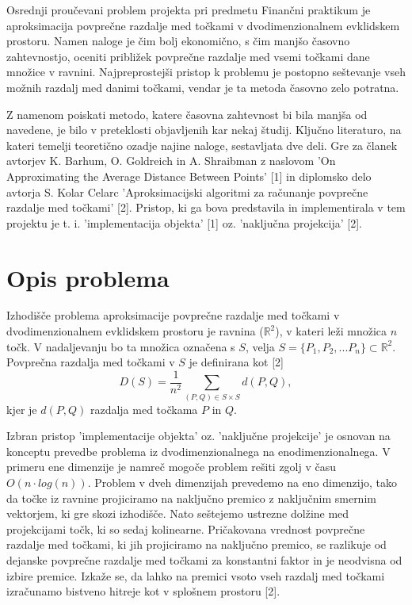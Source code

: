 \documentclass[12pt,a4paper]{amsart}
\theoremstyle{definition} %
\theoremstyle{plain} %
\newcommand{\R}{\mathbb R}
\begin{document}
Osrednji proučevani problem projekta pri predmetu Finančni praktikum je aproksimacija povprečne razdalje med točkami v dvodimenzionalnem evklidskem prostoru. Namen naloge je čim bolj ekonomično, s čim manjšo časovno zahtevnostjo, oceniti približek povprečne razdalje med vsemi točkami dane množice v ravnini. Najpreprostejši pristop k problemu je postopno seštevanje vseh možnih razdalj med danimi točkami, vendar je ta metoda časovno zelo potratna. 

Z namenom poiskati metodo, katere časovna zahtevnost bi bila manjša od navedene, je bilo v preteklosti objavljenih kar nekaj študij. Ključno literaturo, na kateri temelji teoretično ozadje najine naloge, sestavljata dve deli. Gre za članek avtorjev K. Barhum, O. Goldreich in A. Shraibman z naslovom 'On Approximating the Average Distance Between Points' [1] in diplomsko delo avtorja S. Kolar Celarc 'Aproksimacijski algoritmi za računanje povprečne razdalje med točkami' [2]. Pristop, ki ga bova predstavila in implementirala v tem projektu je t. i. 'implementacija objekta' [1] oz. 'naključna projekcija' [2]. 

\section{Opis problema}

Izhodišče problema aproksimacije povprečne razdalje med točkami v dvodimenzionalnem evklidskem prostoru je ravnina ($\R^2$), v kateri leži množica $n$ točk. V nadaljevanju bo ta množica označena s $S$, velja $S = \{ P_{1}, P_{2}, ...  P_{n} \} \subset \R^2$. Povprečna razdalja med točkami v $S$ je definirana kot [2] $$ D(S) = \frac{1}{n^2} \sum_{(P,Q) \in S \times S}^{} d(P,Q) ,$$ kjer je $d(P,Q)$ razdalja med točkama $P$ in $Q$.

Izbran pristop  'implementacije objekta' oz. 'naključne projekcije' je osnovan na konceptu prevedbe problema iz dvodimenzionalnega na enodimenzionalnega. V primeru ene dimenzije je namreč mogoče problem rešiti zgolj v času $O(n \cdot log(n))$. Problem v dveh dimenzijah prevedemo na eno dimenzijo, tako da točke iz ravnine projiciramo na naključno premico z naključnim smernim vektorjem, ki gre skozi izhodišče. Nato seštejemo ustrezne dolžine med projekcijami točk, ki so sedaj kolinearne. Pričakovana vrednost povprečne razdalje med točkami, ki jih projiciramo na naključno premico, se razlikuje od dejanske povprečne razdalje med točkami za konstantni faktor in je neodvisna od izbire premice. Izkaže se, da lahko na premici vsoto vseh razdalj med točkami izračunamo bistveno hitreje kot v splošnem prostoru [2]. 
\end{document}
